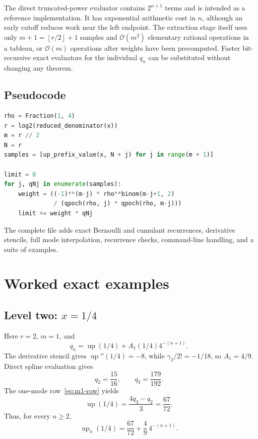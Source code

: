\documentclass[11pt,a4paper]{article}
\theoremstyle{remark}
\newcommand{\up}{\operatorname{up}}
\newcommand{\floor}[1]{\left\lfloor #1\right\rfloor}
\newcommand{\BigO}{\mathcal{O}}
\begin{document}
The direct truncated-power evaluator contains $2^{n+1}$ terms and is intended
as a reference implementation.  It has exponential arithmetic cost in $n$,
although an early cutoff reduces work near the left endpoint.  The extraction
stage itself uses only $m+1=\floor{r/2}+1$ samples and $\BigO(m^2)$ elementary
rational operations in a tableau, or $\BigO(m)$ operations after weights have
been precomputed.  Faster bit-recursive exact evaluators for the individual
$q_n$ can be substituted without changing any theorem.

\subsection{Pseudocode}

\begin{lstlisting}[language=Python,caption={Core exact extraction in pseudocode.}]
rho = Fraction(1, 4)
r = log2(reduced_denominator(x))
m = r // 2
N = r
samples = [up_prefix_value(x, N + j) for j in range(m + 1)]

limit = 0
for j, qNj in enumerate(samples):
    weight = ((-1)**(m-j) * rho**binom(m-j+1, 2)
              / (qpoch(rho, j) * qpoch(rho, m-j)))
    limit += weight * qNj
\end{lstlisting}

The complete file  adds exact Bernoulli and
cumulant recurrences, derivative stencils, full mode interpolation, recurrence
checks, command-line handling, and a suite of examples.

\section{Worked exact examples}
\label{sec:examples}

\subsection{Level two: \texorpdfstring{$x=1/4$}{x=1/4}}

Here $r=2$, $m=1$, and
\begin{equation}
 q_n=\up(1/4)+A_1(1/4)4^{-(n+1)}.
 \label{eq:xquarter-model}
\end{equation}
The derivative stencil gives $\up''(1/4)=-8$, while
$\gamma_2/2!=-1/18$, so $A_1=4/9$.  Direct spline evaluation gives
\begin{equation}
 q_2=\frac{15}{16},
 \qquad q_3=\frac{179}{192}.
 \label{eq:xquarter-samples}
\end{equation}
The one-mode row~\eqref{eq:m1-row} yields
\begin{equation}
 \up(1/4)=\frac{4q_3-q_2}{3}=\frac{67}{72}.
 \label{eq:xquarter-value}
\end{equation}
Thus, for every $n\ge2$,
\begin{equation}
 \boxed{
 \up_n(1/4)=\frac{67}{72}+\frac49\,4^{-(n+1)}. }
 \label{eq:xquarter-final}
\end{equation}
\end{document}
